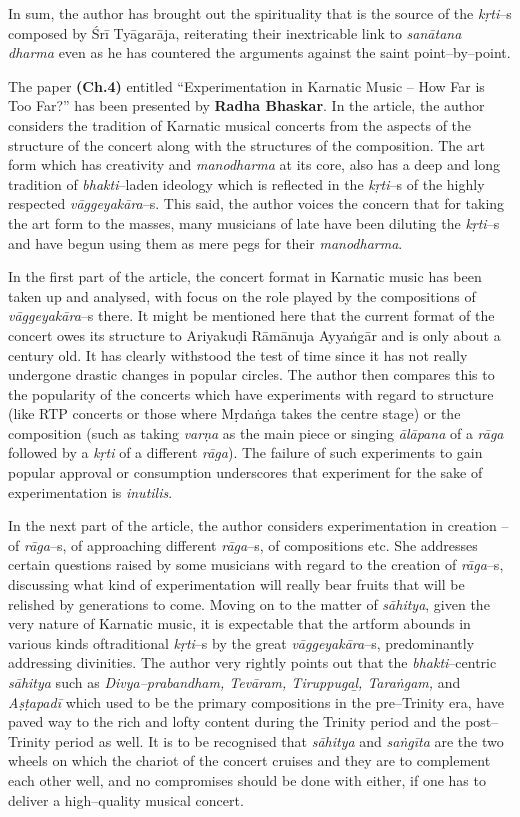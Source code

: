 In sum, the author has brought out the spirituality that is the source of the \textit{kṛti}–s composed by Śrī Tyāgarāja, reiterating their inextricable link to \textit{sanātana dharma} even as he has countered the arguments against the saint point–by–point.

The paper \textbf{(Ch.4)} entitled “Experimentation in Karnatic Music – How Far is Too Far?” has been presented by \textbf{Radha Bhaskar}. In the article, the author considers the tradition of Karnatic musical concerts from the aspects of the structure of the concert along with the structures of the composition. The art form which has creativity and \textit{manodharma} at its core, also has a deep and long tradition of \textit{bhakti}–laden ideology which is reflected in the \textit{kṛti}–s of the highly respected \textit{vāggeyakāra}–s. This said, the author voices the concern that for taking the art form to the masses, many musicians of late have been diluting the \textit{kṛti}–s and have begun using them as mere pegs for their \textit{manodharma}.

In the first part of the article, the concert format in Karnatic music has been taken up and analysed, with focus on the role played by the compositions of \textit{vāggeyakāra}–s there. It might be mentioned here that the current format of the concert owes its structure to Ariyakuḍi Rāmānuja Ayyaṅgār and is only about a century old. It has clearly withstood the test of time since it has not really undergone drastic changes in popular circles. The author then compares this to the popularity of the concerts which have experiments with regard to structure (like RTP concerts or those where Mṛdaṅga takes the centre stage) or the composition (such as taking \textit{varṇa} as the main piece or singing \textit{ālāpana} of a \textit{rāga} followed by a \textit{kṛti} of a different \textit{rāga}). The failure of such experiments to gain popular approval or consumption underscores that experiment for the sake of experimentation is \textit{inutilis}.

In the next part of the article, the author considers experimentation in creation – of \textit{rāga}–s, of approaching different \textit{rāga}–s, of compositions etc. She addresses certain questions raised by some musicians with regard to the creation of \textit{rāga}–s, discussing what kind of experimentation will really bear fruits that will be relished by generations to come. Moving on to the matter of \textit{sāhitya}, given the very nature of Karnatic music, it is expectable that the artform abounds in various kinds of\break traditional \textit{kṛti}–s by the great \textit{vāggeyakāra}–s, predominantly addressing divinities. The author very rightly points out that the \textit{bhakti}–centric \textit{sāhitya} such as \textit{Divya–prabandham, Tevāram, Tiruppugaḻ, Taraṅgam, }and\textit{ Aṣṭapadī} which used to be the primary compositions in the pre–Trinity era, have paved way to the rich and lofty content during the Trinity period and the post–Trinity period as well. It is to be recognised that \textit{sāhitya} and \textit{saṅgīta} are the two wheels on which the chariot of the concert cruises and they are to complement each other well, and no compromises should be done with either, if one has to deliver a high–quality musical concert.

